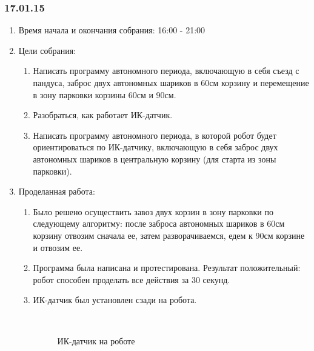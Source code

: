 \subsubsection{17.01.15}
\begin{enumerate}
	\item Время начала и окончания собрания: 16:00 - 21:00
	
	\item Цели собрания:
	\begin{enumerate}
		\item Написать программу автономного периода, включающую в себя съезд с пандуса, заброс двух автономных шариков в 60см корзину и перемещение в зону парковки корзины 60см и 90см.
		
		\item Разобраться, как работает ИК-датчик.
		
		\item Написать программу автономного периода, в которой робот будет ориентироваться по ИК-датчику, включающую в себя заброс двух автономных шариков в центральную корзину (для старта из зоны парковки).
	\end{enumerate}
	\item Проделанная работа:
	\begin{enumerate}
		\item Было решено осуществить завоз двух корзин в зону парковки по следующему алгоритму: после заброса автономных шариков в 60см корзину отвозим сначала ее, затем разворачиваемся, едем к 90см корзине и отвозим ее.
		
		\item Программа была написана и протестирована. Результат положительный: робот способен проделать все действия за 30 секунд.
		
		\item  ИК-датчик был установлен сзади на робота.
		\begin{figure}[H]
			\begin{minipage}[h]{0.2\linewidth}
				\center  
			\end{minipage}
			\begin{minipage}[h]{0.6\linewidth}
				\caption{ИК-датчик на роботе}
			\end{minipage}
		\end{figure}
		

\end{enumerate}
\end{enumerate}
